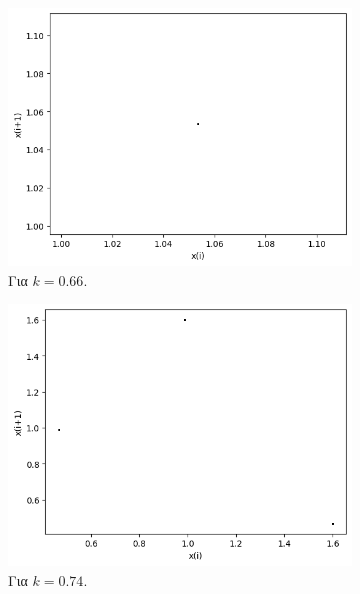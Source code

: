 \begin{figure}[h!]
	\centering
	\begin{subfigure}[b]{0.4\textwidth}
		\centering
		\includegraphics[width=\textwidth]{LateX images/graphs q19/g9}
		\caption{Για $k=0.66$.}
		\label{f:k98}
	\end{subfigure}
	\hfill
	\begin{subfigure}[b]{0.4\textwidth}
		\centering
		\includegraphics[width=\textwidth]{LateX images/graphs q19/g10}
		\caption{Για $k=0.74$.}
		\label{f:k99}
	\end{subfigure}
	\hfill
	\begin{subfigure}[b]{0.4\textwidth}
		\centering

\end{subfigure}
\end{figure}
